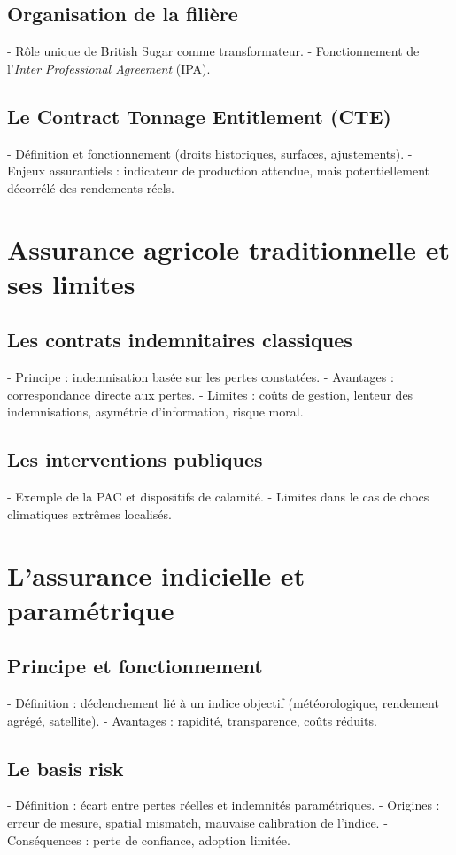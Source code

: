 \documentclass[11pt,a4paper,openright,twoside]{report}
\begin{document}
\subsection{Organisation de la filière}
- Rôle unique de British Sugar comme transformateur.  
- Fonctionnement de l’\textit{Inter Professional Agreement} (IPA).  

\subsection{Le Contract Tonnage Entitlement (CTE)}
- Définition et fonctionnement (droits historiques, surfaces, ajustements).  
- Enjeux assurantiels : indicateur de production attendue, mais potentiellement décorrélé des rendements réels.  

\section{Assurance agricole traditionnelle et ses limites}
\subsection{Les contrats indemnitaires classiques}
- Principe : indemnisation basée sur les pertes constatées.  
- Avantages : correspondance directe aux pertes.  
- Limites : coûts de gestion, lenteur des indemnisations, asymétrie d’information, risque moral.  

\subsection{Les interventions publiques}
- Exemple de la PAC et dispositifs de calamité.  
- Limites dans le cas de chocs climatiques extrêmes localisés.  

\section{L’assurance indicielle et paramétrique}
\subsection{Principe et fonctionnement}
- Définition : déclenchement lié à un indice objectif (météorologique, rendement agrégé, satellite).  
- Avantages : rapidité, transparence, coûts réduits.  

\subsection{Le basis risk}
- Définition : écart entre pertes réelles et indemnités paramétriques.  
- Origines : erreur de mesure, spatial mismatch, mauvaise calibration de l’indice.  
- Conséquences : perte de confiance, adoption limitée.  
\end{document}
